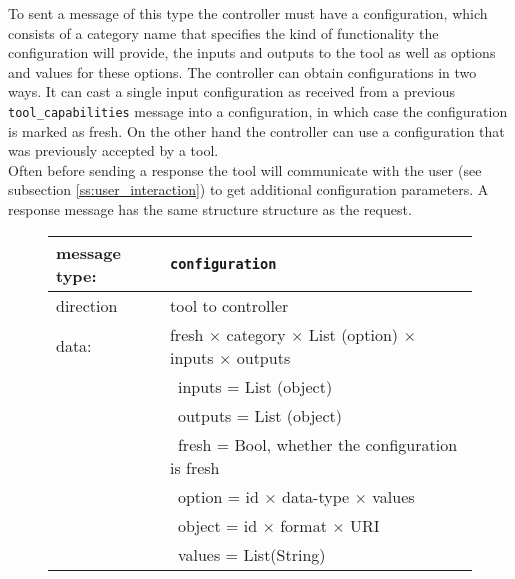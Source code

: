 \documentclass{article}
\newcommand{\msg}[1]{\texttt{#1}}
\begin{document}
   \noindent To sent a message of this type the controller must have a
   configuration, which consists of a category name that specifies the kind of
   functionality the configuration will provide, the inputs and outputs to the
   tool as well as options and values for these options. The controller can
   obtain configurations in two ways. It can cast a single input configuration as
   received from a previous \msg{tool\_capabilities} message into a
   configuration, in which case the configuration is marked as fresh. On the
   other hand the controller can use a configuration that was previously
   accepted by a tool.
   \\[4pt]
   Often before sending a response the tool will communicate with the user (see
   subsection \ref{ss:user_interaction}) to get additional configuration
   parameters. A response message has the same structure structure as the request. 

   \begin{figure}[H]
    \begin{tabular}{|ll|}
     \hline
      message type:   & \msg{configuration} \\
     \hline
      direction       & tool to controller \\
      data:           & fresh $\times$ category $\times$ List (option) $\times$ inputs $\times$ outputs \\
                      & \ inputs  = List (object) \\
                      & \ outputs = List (object) \\
                      & \ fresh   = Bool, whether the configuration is fresh \\
                      & \ option  = id $\times$ data-type $\times$ values \\
                      & \ object  = id $\times$ format $\times$ URI \\
                      & \ values  = List(String) \\
     \hline
    \end{tabular}
   \end{figure}
\end{document}
